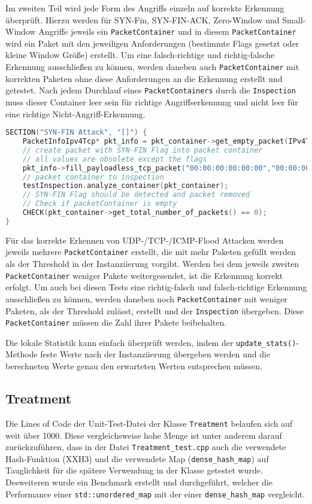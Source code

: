 \documentclass[../review_3.tex]{subfiles}
\begin{document}
Im zweiten Teil wird jede Form des Angriffs einzeln auf korrekte Erkennung überprüft. Hierzu werden für SYN-Fin, SYN-FIN-ACK, Zero-Window und Small-Window Angriffe jeweils ein \texttt{PacketContainer} und in diesem \texttt{PacketContainer} wird ein Paket mit den jeweiligen Anforderungen (bestimmte Flags gesetzt oder kleine Window Größe) erstellt. Um eine falsch-richtige und richtig-falsche Erkennung ausschließen zu können, werden daneben auch \texttt{PacketContainer} mit korrekten Paketen ohne diese Anforderungen an die Erkennung erstellt und getestet. Nach jedem Durchlauf eines \texttt{PacketContainers} durch die \texttt{Inspection} muss dieser Container leer sein für richtige Angriffserkennung und nicht leer für eine richtige Nicht-Angriff-Erkennung.

\begin{lstlisting}[language=C++, caption={Test von SYN-FIN Angriffen in \texttt{Inspection\_test.cpp}}, label=synfininspection]
SECTION("SYN-FIN Attack", "[]") {
    PacketInfoIpv4Tcp* pkt_info = pkt_container->get_empty_packet(IPv4TCP);
    // create packet with SYN-FIN Flag into packet container
    // all values are obsolete except the flags 
    pkt_info->fill_payloadless_tcp_packet("00:00:00:00:00:00","00:00:00:00:00:00",0,0,0,0,0,0,0b00000011,0);
    // packet container to inspection
    testInspection.analyze_container(pkt_container);
    // SYN-FIN Flag should be detected and packet removed
    // Check if packetContainer is empty
    CHECK(pkt_container->get_total_number_of_packets() == 0);
}
\end{lstlisting}

Für das korrekte Erkennen von UDP-/TCP-/ICMP-Flood Attacken werden jeweils mehrere \texttt{PacketContainer} erstellt, die mit mehr Paketen gefüllt werden als der Threshold in der Instanziierung vorgibt. Werden bei dem jeweils zweiten \texttt{PacketContainer} weniger Pakete weitergesendet, ist die Erkennung korrekt erfolgt. Um auch bei diesen Tests eine richtig-falsch und falsch-richtige Erkennung ausschließen zu können, werden daneben noch \texttt{PacketContainer} mit weniger Paketen, als der Threshold zulässt, erstellt und der \texttt{Inspection} übergeben. Diese \texttt{PacketContainer} müssen die Zahl ihrer Pakete beibehalten.

Die lokale Statistik kann einfach überprüft werden, indem der \texttt{update\_stats()}-Methode feste Werte nach der Instanziierung übergeben werden und die berechneten Werte genau den erwarteten Werten entsprechen müssen.

\subsection{Treatment}
Die Lines of Code der Unit-Test-Datei der Klasse \texttt{Treatment} belaufen sich auf weit über 1000. Diese vergleichsweise hohe Menge ist unter anderem darauf zurückzuführen, dass in der Datei \texttt{Treatment\_test.cpp} auch die verwendete Hash-Funktion (XXH3) und die verwendete Map (\texttt{dense\_hash\_map}) auf Tauglichkeit für die spätere Verwendung in der Klasse getestet wurde. Desweiteren wurde ein Benchmark erstellt und durchgeführt, welcher die Performance einer \texttt{std::unordered\_map} mit der einer \texttt{dense\_hash\_map} vergleicht.
\end{document}
